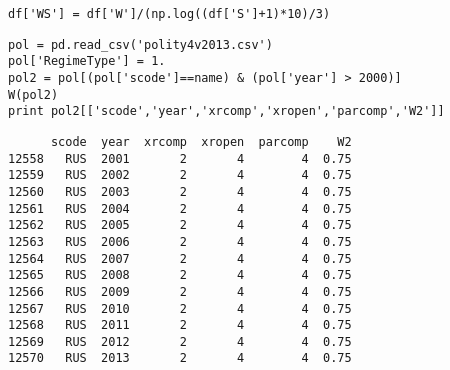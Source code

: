 \documentclass[12pt,fleqn]{article}\usepackage{common}
\begin{document}

\begin{verbatim}
df['WS'] = df['W']/(np.log((df['S']+1)*10)/3)
\end{verbatim}


\begin{verbatim}
pol = pd.read_csv('polity4v2013.csv')
pol['RegimeType'] = 1.
pol2 = pol[(pol['scode']==name) & (pol['year'] > 2000)]
W(pol2)
print pol2[['scode','year','xrcomp','xropen','parcomp','W2']]
\end{verbatim}

\begin{verbatim}
      scode  year  xrcomp  xropen  parcomp    W2
12558   RUS  2001       2       4        4  0.75
12559   RUS  2002       2       4        4  0.75
12560   RUS  2003       2       4        4  0.75
12561   RUS  2004       2       4        4  0.75
12562   RUS  2005       2       4        4  0.75
12563   RUS  2006       2       4        4  0.75
12564   RUS  2007       2       4        4  0.75
12565   RUS  2008       2       4        4  0.75
12566   RUS  2009       2       4        4  0.75
12567   RUS  2010       2       4        4  0.75
12568   RUS  2011       2       4        4  0.75
12569   RUS  2012       2       4        4  0.75
12570   RUS  2013       2       4        4  0.75
\end{verbatim}
\end{document}
